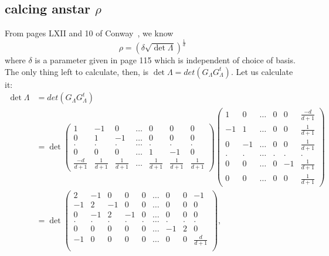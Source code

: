 \subsection{calcing anstar $\rho$}

 From pages LXII and 10 of Conway~\cite{conway2013sphere}, we know 
    \[
        \rho = (\delta\sqrt{\det{\Lambda}})^{\frac{1}{d}}
    \]
    where $\delta$ is a parameter given in page 115 which is independent of choice of basis. The only thing left to calculate, then, is $\det{\Lambda}=det(G_\Lambda G_\Lambda^t)$. Let us calculate it:
    \begin{align*}
        \det{\Lambda}&=det(G_\Lambda G_\Lambda^t)\\
        &=\det\begin{pmatrix}
            1 & -1 &  0  & \dots & 0 & 0 & 0 \\
            0 & 1  &  -1 & \dots & 0 & 0 & 0 \\
            . & .  &  . & \dots & . & .  & .\\
            0 & 0  &  0 & \dots & 1 & -1 & 0\\
            \frac{-d}{d+1} & \frac{1}{d+1} & \frac{1}{d+1} & \dots & \frac{1}{d+1} & \frac{1}{d+1} & \frac{1}{d+1}
        \end{pmatrix}
        \begin{pmatrix}
            1 & 0 & \dots & 0 & 0 & \frac{-d}{d+1} \\
            -1 & 1 & \dots & 0 & 0 & \frac{1}{d+1} \\
            0 & -1 & \dots & 0 & 0 & \frac{1}{d+1} \\
            . & . & \dots & . & .  & .\\
            0 & 0 & \dots & 0 & -1 & \frac{1}{d+1}\\
            0 & 0 & \dots & 0 & 0 & \frac{1}{d+1}
        \end{pmatrix}\\
        &=\det\begin{pmatrix}
            2 & -1 &  0  & 0 & 0 &\dots & 0 & 0 & -1\\
            -1 & 2  &  -1 & 0 & 0 &\dots & 0 & 0 & 0\\
            0 & -1  &  2 & -1 & 0 & \dots & 0 & 0 & 0\\
            . & .  &  . & . & . & \dots & . & . & .\\
            0 & 0  &  0 & 0 & 0 & \dots & -1 & 2 & 0\\
            -1 & 0  &  0 & 0 & 0 &\dots & 0 & 0 & \frac{d}{d+1}\\
        \end{pmatrix},\\
    \end{align*}

